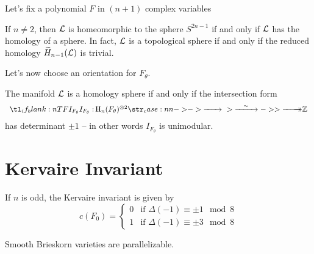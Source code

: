 Let's fix a polynomial $F$ in $(n+1)$ complex variables

\begin{proposition}
  If $n\neq 2$, then $\mathcal{L}$ is homeomorphic to the sphere $S^{2n-1}$ if and only if $\mathcal{L}$ has the homology of a sphere. In fact, $\mathcal{L}$ is a topological sphere if and only if the reduced homology $\widetilde{H}_{n-1}(\mathcal{L})$ is trivial.
\end{proposition}

Let's now choose an orientation for $F_\theta$.

\begin{proposition}
  The manifold $\mathcal{L}$ is a homology sphere if and only if the intersection form
  \[
    \lkxfunc{I_{F_\theta}}{\H_n(F_\theta)^{\otimes 2}}{\Z}
  \]
  has determinant $\pm 1$ -- in other words $I_{F_\theta}$ is unimodular.
\end{proposition}

\section{Kervaire Invariant}

\begin{theorem}
\end{theorem}

\begin{theorem}[Levine]
  If $n$ is odd, the Kervaire invariant is given by
  \[
    c(F_0) = \begin{cases} 
      0 & \textrm{if }\Delta(-1)\equiv \pm 1\mod 8\\
      1 & \textrm{if }\Delta(-1)\equiv \pm 3\mod 8
    \end{cases}
  \]
\end{theorem}

\begin{theorem} Smooth Brieskorn varieties are parallelizable.
\end{theorem}
